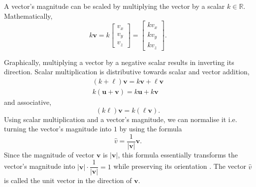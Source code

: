 \documentclass[conference]{IEEEtran}
\begin{document}
A vector's magnitude can be scaled by multiplying the vector by a scalar $k \in \mathbb{R}$. Mathematically,
\begin{equation}
    k\mathbf{v} = k \begin{bmatrix}v_x \\ v_y \\ v_z \end{bmatrix} = \begin{bmatrix} kv_x \\ kv_y \\ kv_z \end{bmatrix}. 
\end{equation}

Graphically, multiplying a vector by a negative scalar results in inverting its direction. Scalar multiplication is distributive towards scalar and vector addition, 
\begin{align}
    (k + \ell)\mathbf{v} = k\mathbf{v} + \ell\mathbf{v} \\
    k(\mathbf{u} + \mathbf{v}) = k\mathbf{u} + k\mathbf{v}
\end{align}
 and associative,
\begin{equation}
    (k\ell)\mathbf{v} = k (\ell\mathbf{v}).
\end{equation}
Using scalar multiplication and a vector's magnitude, we can normalise it i.e. turning the vector's magnitude into $1$ by using the formula
\begin{equation}
    \hat{v} = \frac{1}{|\mathbf{v}|} \mathbf{v}.
\end{equation}
Since the magnitude of vector $\mathbf{v}$ is $|\mathbf{v}|$, this formula essentially transforms the vector's magnitude into $|\mathbf{v}| \cdot \dfrac{1}{|\mathbf{v}|} = 1$ while preserving its orientation \cite{lengyel}. The vector $\hat{v}$ is called the unit vector in the direction of $\mathbf{v}$.
\end{document}
